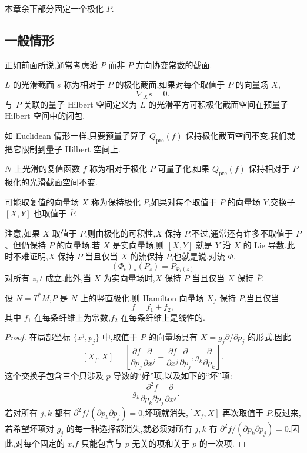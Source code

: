 本章余下部分固定一个极化 $P$.

\subsection{一般情形}
\label{subsec:polarization-general-case}

正如前面所说,通常考虑沿 $\overline P$ 而非 $P$ 方向协变常数的截面.

\begin{definition}
\label{def:polarized-section}
$L$ 的光滑截面 $s$ 称为相对于 $P$ 的极化截面,如果对每个取值于 $\overline P$ 的向量场 $X$,
\[
 \nabla_Xs=0.
 \label{eq:polarized-section}
\]
与 $P$ 关联的量子 Hilbert 空间定义为 $L$ 的光滑平方可积极化截面空间在预量子 Hilbert 空间中的闭包.
\end{definition}

如 Euclidean 情形一样,只要预量子算子 $Q_{\mathrm{pre}}(f)$ 保持极化截面空间不变,我们就把它限制到量子 Hilbert 空间上.

\begin{definition}[可量子化函数]
\label{def:quantizable-function}
$N$ 上光滑的复值函数 $f$ 称为相对于极化 $P$ 可量子化,如果 $Q_{\mathrm{pre}}(f)$ 保持相对于 $P$ 极化的光滑截面空间不变.
\end{definition}

\begin{definition}[保持极化的向量场]
\label{def:polarization-preserving-vector-field}
可能取复值的向量场 $X$ 称为保持极化 $P$,如果对每个取值于 $\overline P$ 的向量场 $Y$,交换子 $[X,Y]$ 也取值于 $\overline P$.
\end{definition}

注意,如果 $X$ 取值于 $\overline P$,则由极化的可积性,$X$ 保持 $P$.不过,通常还有许多不取值于 $\overline P$、但仍保持 $P$ 的向量场.若 $X$ 是实向量场,则 $[X,Y]$ 就是 $Y$ 沿 $X$ 的 Lie 导数.此时不难证明,$X$ 保持 $P$ 当且仅当 $X$ 的流保持 $P$,也就是说,对流 $\Phi$,
\[
 (\Phi_t)_*(P_z)=P_{\Phi_t(z)}
\]
对所有 $z,t$ 成立.此外,当 $X$ 为实向量场时,$X$ 保持 $P$ 当且仅当 $X$ 保持 $\overline P$.

\begin{example}[余切丛竖直极化的可量子化函数]
\label{ex:vertical-quantizability}
设 $N=T^*M$,$P$ 是 $N$ 上的竖直极化.则 Hamilton 向量场 $X_f$ 保持 $P$,当且仅当
\[
 f=f_1+f_2,
\]
其中 $f_1$ 在每条纤维上为常数,$f_2$ 在每条纤维上是线性的.
\end{example}

\begin{proof}
在局部坐标 $\{x^j,p_j\}$ 中,取值于 $P$ 的向量场具有 $X=g_j\partial/\partial p_j$ 的形式.因此
\[
 [X_f,X]
 =\left[\frac{\partial f}{\partial p_j}\frac{\partial}{\partial x^j}
 -\frac{\partial f}{\partial x^j}\frac{\partial}{\partial p_j},
 g_k\frac{\partial}{\partial p_k}\right].
\]
这个交换子包含三个只涉及 $p$ 导数的“好”项,以及如下的“坏”项:
\[
 -g_k\frac{\partial^2f}{\partial p_k\partial p_j}
 \frac{\partial}{\partial x^j}.
\]
若对所有 $j,k$ 都有 $\partial^2f/(\partial p_k\partial p_j)=0$,坏项就消失,$[X_f,X]$ 再次取值于 $P$.反过来,若希望坏项对 $g_j$ 的每一种选择都消失,就必须对所有 $j,k$ 有 $\partial^2f/(\partial p_k\partial p_j)=0$.因此,对每个固定的 $x$,$f$ 只能包含与 $p$ 无关的项和关于 $p$ 的一次项.
\end{proof}

